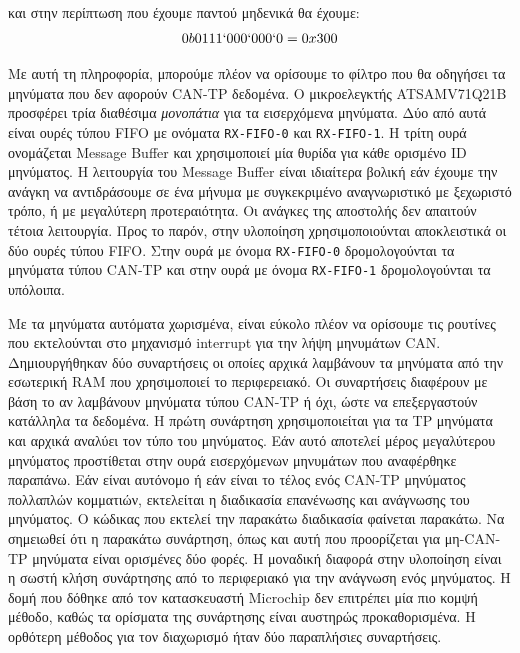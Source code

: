 \documentclass[a4paper,nobib,justified]{tufte-book}
\begin{document}
και στην περίπτωση που έχουμε παντού μηδενικά θα έχουμε:
\begin{equation}
0b0111`000`000`0 = 0x300
\end{equation}

Με αυτή τη πληροφορία, μπορούμε πλέον να ορίσουμε το φίλτρο που θα οδηγήσει τα μηνύματα που δεν αφορούν CAN-TP δεδομένα. Ο μικροελεγκτής ATSAMV71Q21B προσφέρει τρία διαθέσιμα \textit{μονοπάτια} για τα εισερχόμενα μηνύματα. Δύο από αυτά είναι ουρές τύπου FIFO με ονόματα \texttt{RX-FIFO-0} και \texttt{RX-FIFO-1}. Η τρίτη ουρά ονομάζεται Message Buffer και χρησιμοποιεί μία θυρίδα για κάθε ορισμένο ID μηνύματος. Η λειτουργία του Message Buffer είναι ιδιαίτερα βολική εάν έχουμε την ανάγκη να αντιδράσουμε σε ένα μήνυμα με συγκεκριμένο αναγνωριστικό με ξεχωριστό τρόπο, ή με μεγαλύτερη προτεραιότητα. Οι ανάγκες της αποστολής δεν απαιτούν τέτοια λειτουργία. Προς το παρόν, στην υλοποίηση χρησιμοποιούνται αποκλειστικά οι δύο ουρές τύπου FIFO. Στην ουρά με όνομα \texttt{RX-FIFO-0} δρομολογούνται τα μηνύματα τύπου CAN-TP και στην ουρά με όνομα \texttt{RX-FIFO-1} δρομολογούνται τα υπόλοιπα.


Με τα μηνύματα αυτόματα χωρισμένα, είναι εύκολο πλέον να ορίσουμε τις ρουτίνες που εκτελούνται στο μηχανισμό interrupt για την λήψη μηνυμάτων CAN. Δημιουργήθηκαν δύο συναρτήσεις οι οποίες αρχικά λαμβάνουν τα μηνύματα από την εσωτερική RAM που χρησιμοποιεί το περιφερειακό. Οι συναρτήσεις διαφέρουν με βάση το αν λαμβάνουν μηνύματα τύπου CAN-TP ή όχι, ώστε να επεξεργαστούν κατάλληλα τα δεδομένα. Η πρώτη συνάρτηση χρησιμοποιείται για τα TP μηνύματα και αρχικά αναλύει τον τύπο του μηνύματος. Εάν αυτό αποτελεί μέρος μεγαλύτερου μηνύματος προστίθεται στην ουρά εισερχόμενων μηνυμάτων που αναφέρθηκε παραπάνω. Εάν είναι αυτόνομο ή εάν είναι το τέλος ενός CAN-TP μηνύματος πολλαπλών κομματιών, εκτελείται η διαδικασία επανένωσης και ανάγνωσης του μηνύματος. Ο κώδικας που εκτελεί την παρακάτω διαδικασία φαίνεται παρακάτω. Να σημειωθεί ότι η παρακάτω συνάρτηση, όπως και αυτή που προορίζεται για μη-CAN-TP μηνύματα είναι ορισμένες δύο φορές. Η μοναδική διαφορά στην υλοποίηση είναι η σωστή κλήση συνάρτησης από το περιφεριακό για την ανάγνωση ενός μηνύματος. Η δομή που δόθηκε από τον κατασκευαστή Microchip δεν επιτρέπει μία πιο κομψή μέθοδο, καθώς τα ορίσματα της συνάρτησης είναι αυστηρώς προκαθορισμένα. Η ορθότερη μέθοδος για τον διαχωρισμό ήταν δύο παραπλήσιες συναρτήσεις.
\end{document}
